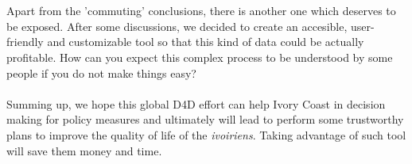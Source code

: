 \\
\\
Apart from the 'commuting' conclusions, there is another one which deserves to be exposed. After some discussions, we decided to create an accesible, user-friendly and customizable tool so that this kind of data could be actually profitable. How can you expect this complex process to be understood by some people if you do not make things easy?
\\
\\
Summing up, we hope this global D4D effort can help Ivory Coast in decision making for policy measures and ultimately will lead to perform some trustworthy plans to improve the quality of life of the {\it ivoiriens}. Taking advantage of such tool will save them money and time.
\\
\\
